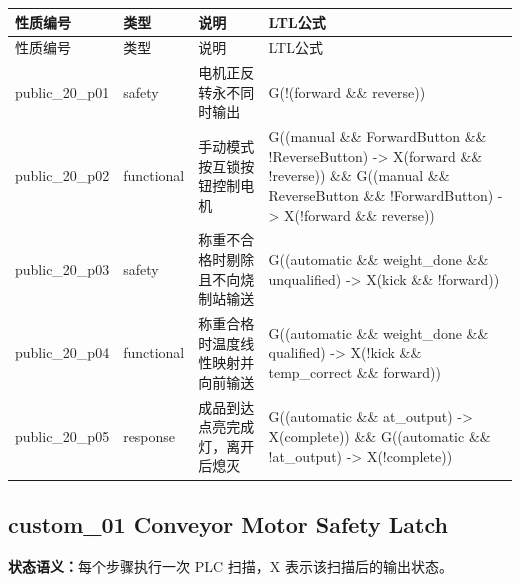 \begin{longtable}{L{2.3cm}L{1.7cm}L{4.1cm}L{5.2cm}}

\toprule

性质编号 & 类型 & 说明 & LTL公式\\

\midrule

\endfirsthead

\toprule

性质编号 & 类型 & 说明 & LTL公式\\

\midrule

\endhead

{\ttfamily public\_20\_p01} & safety & 电机正反转永不同时输出 & {\ttfamily G(!(forward \&\& reverse))}\\

{\ttfamily public\_20\_p02} & functional & 手动模式按互锁按钮控制电机 & {\ttfamily G((manual \&\& ForwardButton \&\& !ReverseButton) -> X(forward \&\& !reverse)) \&\& G((manual \&\& ReverseButton \&\& !ForwardButton) -> X(!forward \&\& reverse))}\\

{\ttfamily public\_20\_p03} & safety & 称重不合格时剔除且不向烧制站输送 & {\ttfamily G((automatic \&\& weight\_done \&\& unqualified) -> X(kick \&\& !forward))}\\

{\ttfamily public\_20\_p04} & functional & 称重合格时温度线性映射并向前输送 & {\ttfamily G((automatic \&\& weight\_done \&\& qualified) -> X(!kick \&\& temp\_correct \&\& forward))}\\

{\ttfamily public\_20\_p05} & response & 成品到达点亮完成灯，离开后熄灭 & {\ttfamily G((automatic \&\& at\_output) -> X(complete)) \&\& G((automatic \&\& !at\_output) -> X(!complete))}\\

\bottomrule

\end{longtable}

\subsection{{\ttfamily custom\_01} Conveyor Motor Safety Latch}

\noindent\textbf{状态语义：}每个步骤执行一次 PLC 扫描，X 表示该扫描后的输出状态。

